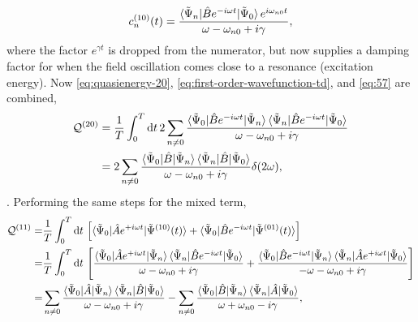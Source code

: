 \documentclass[%
class = book,%
crop = false,%
float = true,%
multi = true,%
preview = false,%
]{standalone}
\begin{document}
\begin{equation}
  \label{eq:57}
  c_{n}^{(10)}(t) = \frac{\braket{\tilde{\Psi}_{n}|\hat{B}e^{-i\omega t}|\tilde{\Psi}_{0}}e^{i\omega_{n0}t}}{\omega - \omega_{n0} + i\gamma},
\end{equation} %
where the factor \(e^{\gamma t}\) is dropped from the numerator, but now supplies a damping factor for when the field oscillation comes close to a resonance (excitation energy). Now \eqref{eq:quasienergy-20}, \eqref{eq:first-order-wavefunction-td}, and \eqref{eq:57} are combined,
\begin{equation}
  \label{eq:58}
  \begin{aligned}
    \mathcal{Q}^{(20)} &= \frac{1}{T} \int_{0}^{T} \mathrm{d}t \, 2\sum_{n\neq 0} \frac{\braket{\tilde{\Psi}_{0}|\hat{B}e^{-i\omega t}|\tilde{\Psi}_{n}}\braket{\tilde{\Psi}_{n}|\hat{B}e^{-i\omega t}|\tilde{\Psi}_{0}}}{\omega - \omega_{n0} + i\gamma} \\
    &= 2\sum_{n\neq 0} \frac{\braket{\tilde{\Psi}_{0}|\hat{B}|\tilde{\Psi}_{n}}\braket{\tilde{\Psi}_{n}|\hat{B}|\tilde{\Psi}_{0}}}{\omega - \omega_{n0} + i\gamma} \delta(2\omega),
  \end{aligned}
\end{equation}
. Performing the same steps for the mixed term,
\begin{equation}
  \label{eq:59}
  \begin{aligned}
    \mathcal{Q}^{(11)} = &\frac{1}{T} \int_{0}^{T} \mathrm{d}t \, \left[ \braket{\tilde{\Psi}_{0}|\hat{A}e^{+i\omega t}|\tilde{\Psi}^{(10)}(t)} + \braket{\tilde{\Psi}_{0}|\hat{B}e^{-i\omega t}|\tilde{\Psi}^{(01)}(t)} \right] \\
    = &\frac{1}{T} \int_{0}^{T} \mathrm{d}t \, \left[ \frac{\braket{\tilde{\Psi}_{0}|\hat{A}e^{+i\omega t}|\tilde{\Psi}_{n}}\braket{\tilde{\Psi}_{n}|\hat{B}e^{-i\omega t}|\tilde{\Psi}_{0}}}{\omega - \omega_{n0} + i\gamma} + \frac{\braket{\tilde{\Psi}_{0}|\hat{B}e^{-i\omega t}|\tilde{\Psi}_{n}}\braket{\tilde{\Psi}_{n}|\hat{A}e^{+i\omega t}|\tilde{\Psi}_{0}}}{-\omega - \omega_{n0} + i\gamma} \right]  \\
    = &\sum_{n\neq 0} \frac{\braket{\tilde{\Psi}_{0}|\hat{A}|\tilde{\Psi}_{n}}\braket{\tilde{\Psi}_{n}|\hat{B}|\tilde{\Psi}_{0}}}{\omega - \omega_{n0} + i\gamma} - \sum_{n\neq 0} \frac{\braket{\tilde{\Psi}_{0}|\hat{B}|\tilde{\Psi}_{n}}\braket{\tilde{\Psi}_{n}|\hat{A}|\tilde{\Psi}_{0}}}{\omega + \omega_{n0} - i\gamma},
  \end{aligned}
\end{equation}
\end{document}
